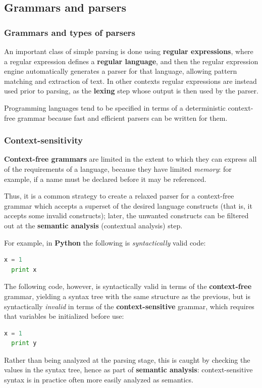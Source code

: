 \documentclass{beamer}
\begin{document}
\subsection{Grammars and parsers}

\begin{frame}
  \frametitle{Grammars and types of parsers}

  An important class of simple parsing is done using \textbf{regular
  expressions}, where a regular expression defines a \textbf{regular language},
  and then the regular expression engine automatically generates a parser for
  that language, allowing pattern matching and extraction of text. In other
  contexts regular expressions are instead used prior to parsing, as the
  \textbf{lexing} step whose output is then used by the parser.

  \vfill

  Programming languages tend to be specified in terms of a deterministic
  context-free grammar because fast and efficient parsers can be written for
  them.
\end{frame}

\begin{frame}
  \frametitle{Context-sensitivity}

  \textbf{Context-free grammars} are limited in the extent to which they can
  express all of the requirements of a language, because they have limited
  \textit{memory}: for example, if a name must be declared before it may be
  referenced.

  \vfill

  Thus, it is a common strategy to create a relaxed parser for a context-free
  grammar which accepts a superset of the desired language constructs (that is,
  it accepts some invalid constructs); later, the unwanted constructs can be
  filtered out at the \textbf{semantic analysis} (contextual analysis) step.
\end{frame}

\begin{frame}[fragile]
  For example, in \textbf{Python} the following is \textit{syntactically} valid
  code:

  \begin{lstlisting}[language=python]
  x = 1
  print x \end{lstlisting}

  The following code, however, is syntactically valid in terms of the
  \textbf{context-free} grammar, yielding a syntax tree with the same structure
  as the previous, but is syntactically \textit{invalid} in terms of the
  \textbf{context-sensitive} grammar, which requires that variables be
  initialized before use:

  \begin{lstlisting}[language=python]
  x = 1
  print y \end{lstlisting}

  Rather than being analyzed at the parsing stage, this is caught by checking
  the values in the syntax tree, hence as part of \textbf{semantic analysis}:
  context-sensitive syntax is in practice often more easily analyzed as
  semantics.
\end{frame}
\end{document}
